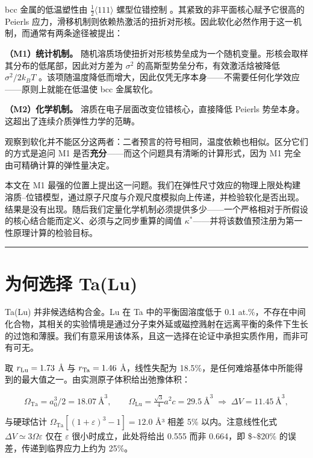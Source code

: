 \documentclass[11pt,a4paper]{article}
\begin{document}
bcc 金属的低温塑性由 \(\tfrac12\langle111\rangle\) 螺型位错控制 \cite{hirth1982,dezerald2014}。其紧致的非平面核心赋予它很高的 Peierls 应力，滑移机制则依赖热激活的扭折对形核。因此软化必然作用于这一机制，而通常有两条途径被提出：

\textbf{（M1）统计机制。} 随机溶质场使扭折对形核势垒成为一个随机变量。形核会取样其分布的低尾部，因此对方差为 \(\sigma^2\) 的高斯型势垒分布，有效激活焓被降低 \(\sigma^2/2k_BT\) \cite{labusch1970,kocks1975}。该项随温度降低而增大，因此仅凭无序本身------不需要任何化学效应------原则上就能在低温使 bcc 金属软化。

\textbf{（M2）化学机制。} 溶质在电子层面改变位错核心，直接降低 Peierls 势垒本身。这超出了连续介质弹性力学的范畴。

观察到软化并不能区分这两者：二者预言的符号相同，温度依赖也相似。区分它们的方式是追问 M1 是否\textbf{充分}------而这个问题具有清晰的计算形式，因为 M1 完全由可精确计算的弹性量决定。

本文在 M1 最强的位置上提出这一问题。我们在弹性尺寸效应的物理上限处构建溶质--位错模型，通过原子尺度与介观尺度模拟向上传递，并检验软化是否出现。结果是没有出现。随后我们定量化学机制必须提供多少------一个严格相对于所假设的核心结合能而定义、必须与之同步重算的阈值 \(\kappa^*\)------并将该数值预注册为第一性原理计算的检验目标。

\begin{center}\rule{0.5\linewidth}{0.5pt}\end{center}

\hypertarget{ux4e3aux4f55ux9009ux62e9-talu}{%
\section{为何选择 Ta(Lu)}\label{sec:ux4e3aux4f55ux9009ux62e9-talu}}

Ta(Lu) 并非候选结构合金。Lu 在 Ta 中的平衡固溶度低于 0.1 at.\%，不存在中间化合物，其相关的实验情境是通过分子束外延或磁控溅射在远离平衡的条件下生长的过饱和薄膜。我们有意采用该体系，且这一选择在论证中承担实质作用，而非可有可无。

取 \(r_{\rm Lu} = 1.73\) Å 与 \(r_{\rm Ta} = 1.46\) Å，线性失配为 18.5\%，是任何难熔基体中所能得到的最大值之一。由实测原子体积给出弛豫体积：

\[\Omega_{\mathrm{Ta}} = a_0^3/2 = 18.07\ \text{\AA}^3,\qquad \Omega_{\mathrm{Lu}} = \tfrac{\sqrt{3}}{4}a^2c = 29.5\ \text{\AA}^3 \;\Longrightarrow\; \Delta V = 11.45\ \text{\AA}^3,\]

与硬球估计 \(\Omega_{\mathrm{Ta}}[(1+\varepsilon)^3-1] = 12.0\) Å³ 相差 5\% 以内。注意线性化式 \(\Delta V \simeq 3\Omega\varepsilon\) 仅在 \(\varepsilon\) 很小时成立，此处将给出 0.555 而非 0.664，即 \$\sim\$20\% 的误差，传递到临界应力上约为 25\%。
\end{document}
